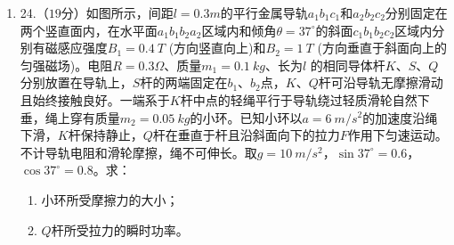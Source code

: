 \begin{enumerate}
{\begin{enumerate}
\end{enumerate}

}



\newpage
\item 
{}
24.（$ 19 $分）如图所示，间距$ l=0.3m $的平行金属导轨$a _ { 1 } b _ { 1 } c _ { 1 }$和$ a_2b_2c_2 $分别固定在两个竖直面内，在水平面$ a_1b_1b_2a_2 $区域内和倾角$ \theta =37 ^{\circ} $的斜面$ c_1b_1b_2c_2 $区域内分别有磁感应强度$ B_1=0.4 \ T $ (方向竖直向上)和$ B_2=1 \ T $ (方向垂直于斜面向上的匀强磁场)。电阻$ R=0.3 \Omega $、质量$ m_{1}=0.1 \ kg $、长为$ l $ 的相同导体杆$ K $、$ S $、$ Q $分别放置在导轨上，$ S $杆的两端固定在$ b_{1} $、$ b_{2} $点，$ K $、$ Q $杆可沿导轨无摩擦滑动且始终接触良好。一端系于$ K $杆中点的轻绳平行于导轨绕过轻质滑轮自然下垂，绳上穿有质量$ m_{2}=0.05 \ kg $的小环。已知小环以$ a=6 \ m/s ^{2} $的加速度沿绳下滑，$ K $杆保持静止，$ Q $杆在垂直于杆且沿斜面向下的拉力$ F $作用下匀速运动。不计导轨电阻和滑轮摩擦，绳不可伸长。取$ g=10 \ m/s ^{2} $，$ \sin 37 ^{\circ} =0.6 $，$ \cos 37 ^{\circ} =0.8 $。求：
\begin{enumerate}
\renewcommand{\labelenumi}{\arabic{enumi}.}
\item
小环所受摩擦力的大小；
\item 
$ Q $杆所受拉力的瞬时功率。



\end{enumerate}
\begin{figure}[h!]
\flushright

\end{figure}





\end{enumerate}
